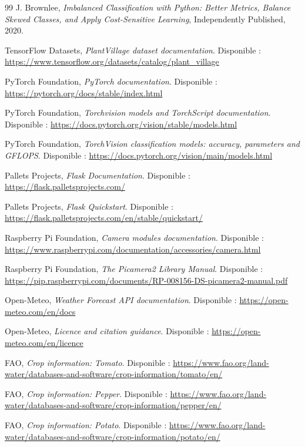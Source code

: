 ﻿\documentclass[11pt,a4paper,openany]{report}
\begin{document}
\begin{thebibliography}{99}
J. Brownlee, \textit{Imbalanced Classification with Python: Better Metrics, Balance Skewed Classes, and Apply Cost-Sensitive Learning}, Independently Published, 2020.

TensorFlow Datasets, \textit{PlantVillage dataset documentation}. Disponible : \url{https://www.tensorflow.org/datasets/catalog/plant_village}

PyTorch Foundation, \textit{PyTorch documentation}. Disponible : \url{https://pytorch.org/docs/stable/index.html}

PyTorch Foundation, \textit{Torchvision models and TorchScript documentation}. Disponible : \url{https://docs.pytorch.org/vision/stable/models.html}

PyTorch Foundation, \textit{TorchVision classification models: accuracy, parameters and GFLOPS}. Disponible : \url{https://docs.pytorch.org/vision/main/models.html}

Pallets Projects, \textit{Flask Documentation}. Disponible : \url{https://flask.palletsprojects.com/}

Pallets Projects, \textit{Flask Quickstart}. Disponible : \url{https://flask.palletsprojects.com/en/stable/quickstart/}

Raspberry Pi Foundation, \textit{Camera modules documentation}. Disponible : \url{https://www.raspberrypi.com/documentation/accessories/camera.html}

Raspberry Pi Foundation, \textit{The Picamera2 Library Manual}. Disponible : \url{https://pip.raspberrypi.com/documents/RP-008156-DS-picamera2-manual.pdf}

Open-Meteo, \textit{Weather Forecast API documentation}. Disponible : \url{https://open-meteo.com/en/docs}

Open-Meteo, \textit{Licence and citation guidance}. Disponible : \url{https://open-meteo.com/en/licence}

FAO, \textit{Crop information: Tomato}. Disponible : \url{https://www.fao.org/land-water/databases-and-software/crop-information/tomato/en/}

FAO, \textit{Crop information: Pepper}. Disponible : \url{https://www.fao.org/land-water/databases-and-software/crop-information/pepper/en/}

FAO, \textit{Crop information: Potato}. Disponible : \url{https://www.fao.org/land-water/databases-and-software/crop-information/potato/en/}


\end{thebibliography}
\end{document}
